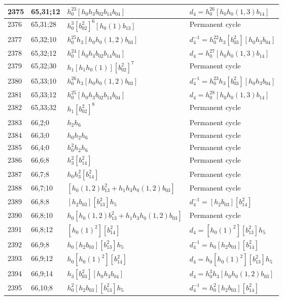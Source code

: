 \documentclass{article}
\begin{document}
\begin{longtable}{|l|l|>{\raggedright\arraybackslash}p{6cm}|>{\raggedright\arraybackslash}p{6cm}|}
\hline
2375 & 65,31;12 & $h_0^{23}[h_0h_3b_{02}b_{14}b_{04}]$ &$d_{4}=h_0^{26}[h_0h_0(1, 3)b_{14}]$\\
\hline
2376 & 65,31;28 & $h_0^3[b_{02}^2]^6[h_0(1)b_{13}]$ & Permanent cycle\\
\hline
2377 & 65,32;10 & $h_0^{25}h_3[h_0h_0(1, 2)b_{03}]$ & $d_{4}^{-1}=h_0^{22}h_3[b_{03}^2][h_0h_3b_{04}]$\\
\hline
2378 & 65,32;12 & $h_0^{24}[h_0h_3b_{02}b_{14}b_{04}]$ &$d_{4}=h_0^{27}[h_0h_0(1, 3)b_{14}]$\\
\hline
2379 & 65,32;30 & $h_1[h_1h_0(1)][b_{02}^2]^7$ & Permanent cycle\\
\hline
2380 & 65,33;10 & $h_0^{26}h_3[h_0h_0(1, 2)b_{03}]$ & $d_{4}^{-1}=h_0^{23}h_3[b_{03}^2][h_0h_3b_{04}]$\\
\hline
2381 & 65,33;12 & $h_0^{25}[h_0h_3b_{02}b_{14}b_{04}]$ &$d_{4}=h_0^{28}[h_0h_0(1, 3)b_{14}]$\\
\hline
2382 & 65,33;32 & $h_1[b_{02}^2]^8$ & Permanent cycle\\
\hline
2383 & 66,2;0 & $h_2h_6$ & Permanent cycle\\
\hline
2384 & 66,3;0 & $h_0h_2h_6$ & Permanent cycle\\
\hline
2385 & 66,4;0 & $h_0^2h_2h_6$ & Permanent cycle\\
\hline
2386 & 66,6;8 & $h_3^2[b_{14}^2]$ & Permanent cycle\\
\hline
2387 & 66,7;8 & $h_0h_3^2[b_{14}^2]$ & Permanent cycle\\
\hline
2388 & 66,7;10 & $[h_0(1, 2)b_{13}^2 + h_1h_3h_0(1, 2)b_{03}]$ & Permanent cycle\\
\hline
2389 & 66,8;8 & $[h_2b_{03}][b_{13}^2]h_5$ & $d_{4}^{-1}=[h_2b_{03}][b_{14}^2]$\\
\hline
2390 & 66,8;10 & $h_0[h_0(1, 2)b_{13}^2 + h_1h_3h_0(1, 2)b_{03}]$ & Permanent cycle\\
\hline
2391 & 66,8;12 & $[h_0(1)^2][b_{14}^2]$ &$d_{4}=[h_0(1)^2][b_{13}^2]h_5$\\
\hline
2392 & 66,9;8 & $h_0[h_2b_{03}][b_{13}^2]h_5$ & $d_{4}^{-1}=h_0[h_2b_{03}][b_{14}^2]$\\
\hline
2393 & 66,9;12 & $h_0[h_0(1)^2][b_{14}^2]$ &$d_{4}=h_0[h_0(1)^2][b_{13}^2]h_5$\\
\hline
2394 & 66,9;14 & $h_3[b_{03}^2][h_0h_3b_{04}]$ &$d_{4}=h_0^3h_3[h_0h_0(1, 2)b_{03}]$\\
\hline
2395 & 66,10;8 & $h_0^2[h_2b_{03}][b_{13}^2]h_5$ & $d_{4}^{-1}=h_0^2[h_2b_{03}][b_{14}^2]$\\

\end{longtable}
\end{document}
